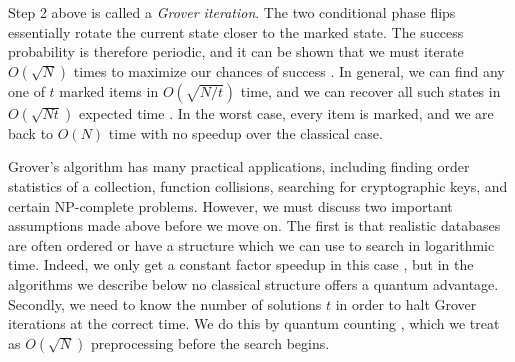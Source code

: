 \documentclass{toc}
\theoremstyle{plain}
\theoremstyle{definition}
\begin{document}
Step 2 above is called a \textit{Grover iteration}. The two conditional
phase flips essentially rotate the current state closer to the marked state.
The success probability is therefore periodic, and it can be shown that
we must iterate $O(\sqrt{N})$ times to maximize our chances of success
\cite{grover98}.
In general, we can find any one of
$t$ marked items in $O(\sqrt{N/t})$ time, and we can recover all such
states in $O(\sqrt{Nt})$ expected time \cite{bbht96}.
In the worst case, every item is
marked, and we are back to $O(N)$ time with no speedup over the classical
case.

Grover's algorithm has many practical applications, including finding
order statistics of a
collection, function collisions, searching for cryptographic keys, and
certain NP-complete problems.
However, we must discuss two important assumptions made above before we
move on.
The first is that realistic databases are often ordered or have a
structure which we can use to search in logarithmic time. Indeed, we only get
a constant factor speedup in this case \cite{fggs99}, but in the algorithms
we describe below no classical structure offers a quantum advantage.
Secondly, we need to know the number of solutions $t$ in order to halt
Grover iterations at the correct time.
We do this by quantum counting \cite{bht98}, which we treat as
$O(\sqrt{N})$ preprocessing before the search begins.


\end{document}
